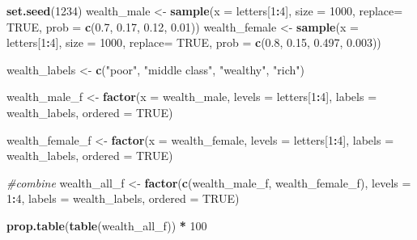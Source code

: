 \documentclass[]{book}
\newenvironment{Shaded}{\begin{snugshade}}{\end{snugshade}}
\newcommand{\CommentTok}[1]{\textcolor[rgb]{0.56,0.35,0.01}{\textit{#1}}}
\newcommand{\DataTypeTok}[1]{\textcolor[rgb]{0.13,0.29,0.53}{#1}}
\newcommand{\DecValTok}[1]{\textcolor[rgb]{0.00,0.00,0.81}{#1}}
\newcommand{\FloatTok}[1]{\textcolor[rgb]{0.00,0.00,0.81}{#1}}
\newcommand{\KeywordTok}[1]{\textcolor[rgb]{0.13,0.29,0.53}{\textbf{#1}}}
\newcommand{\NormalTok}[1]{#1}
\newcommand{\OperatorTok}[1]{\textcolor[rgb]{0.81,0.36,0.00}{\textbf{#1}}}
\newcommand{\OtherTok}[1]{\textcolor[rgb]{0.56,0.35,0.01}{#1}}
\newcommand{\StringTok}[1]{\textcolor[rgb]{0.31,0.60,0.02}{#1}}
\begin{document}
\begin{Shaded}
\begin{Highlighting}[]
\KeywordTok{set.seed}\NormalTok{(}\DecValTok{1234}\NormalTok{)}
\NormalTok{wealth_male <-}\StringTok{ }\KeywordTok{sample}\NormalTok{(}\DataTypeTok{x =}\NormalTok{ letters[}\DecValTok{1}\OperatorTok{:}\DecValTok{4}\NormalTok{], }
                 \DataTypeTok{size =} \DecValTok{1000}\NormalTok{,}
                 \DataTypeTok{replace=} \OtherTok{TRUE}\NormalTok{, }
                 \DataTypeTok{prob =} \KeywordTok{c}\NormalTok{(}\FloatTok{0.7}\NormalTok{, }\FloatTok{0.17}\NormalTok{, }\FloatTok{0.12}\NormalTok{, }\FloatTok{0.01}\NormalTok{))}
\NormalTok{wealth_female <-}\StringTok{ }\KeywordTok{sample}\NormalTok{(}\DataTypeTok{x =}\NormalTok{ letters[}\DecValTok{1}\OperatorTok{:}\DecValTok{4}\NormalTok{], }
                 \DataTypeTok{size =} \DecValTok{1000}\NormalTok{,}
                 \DataTypeTok{replace=} \OtherTok{TRUE}\NormalTok{, }
                 \DataTypeTok{prob =} \KeywordTok{c}\NormalTok{(}\FloatTok{0.8}\NormalTok{, }\FloatTok{0.15}\NormalTok{, }\FloatTok{0.497}\NormalTok{, }\FloatTok{0.003}\NormalTok{))}

\NormalTok{wealth_labels <-}\StringTok{ }\KeywordTok{c}\NormalTok{(}\StringTok{"poor"}\NormalTok{, }\StringTok{"middle class"}\NormalTok{, }\StringTok{"wealthy"}\NormalTok{, }\StringTok{"rich"}\NormalTok{)}

\NormalTok{wealth_male_f <-}\StringTok{ }\KeywordTok{factor}\NormalTok{(}\DataTypeTok{x =}\NormalTok{ wealth_male,}
                        \DataTypeTok{levels =}\NormalTok{ letters[}\DecValTok{1}\OperatorTok{:}\DecValTok{4}\NormalTok{],}
                        \DataTypeTok{labels =}\NormalTok{ wealth_labels,}
                        \DataTypeTok{ordered =} \OtherTok{TRUE}\NormalTok{)}

\NormalTok{wealth_female_f <-}\StringTok{ }\KeywordTok{factor}\NormalTok{(}\DataTypeTok{x =}\NormalTok{ wealth_female,}
                        \DataTypeTok{levels =}\NormalTok{ letters[}\DecValTok{1}\OperatorTok{:}\DecValTok{4}\NormalTok{],}
                        \DataTypeTok{labels =}\NormalTok{ wealth_labels,}
                        \DataTypeTok{ordered =} \OtherTok{TRUE}\NormalTok{)}

\CommentTok{#combine}
\NormalTok{wealth_all_f <-}\StringTok{ }\KeywordTok{factor}\NormalTok{(}\KeywordTok{c}\NormalTok{(wealth_male_f, wealth_female_f),}
                        \DataTypeTok{levels =} \DecValTok{1}\OperatorTok{:}\DecValTok{4}\NormalTok{,}
                        \DataTypeTok{labels =}\NormalTok{ wealth_labels,}
                        \DataTypeTok{ordered =} \OtherTok{TRUE}\NormalTok{)}

\KeywordTok{prop.table}\NormalTok{(}\KeywordTok{table}\NormalTok{(wealth_all_f)) }\OperatorTok{*}\StringTok{ }\DecValTok{100}
\end{Highlighting}
\end{Shaded}
\end{document}
